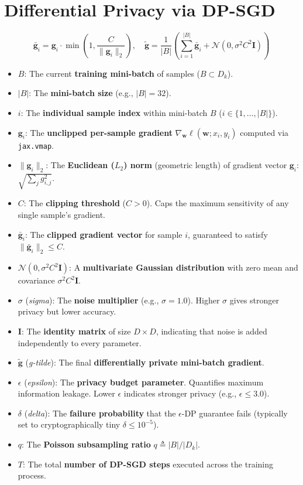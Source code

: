 \documentclass[11pt,a4paper,titlepage]{report}
\begin{document}
\section{Differential Privacy via DP-SGD}
\begin{equation}
    \bar{\mathbf{g}}_i = \mathbf{g}_i \cdot \min\left(1, \frac{C}{\|\mathbf{g}_i\|_2}\right), \quad \tilde{\mathbf{g}} = \frac{1}{|B|} \left( \sum_{i=1}^{|B|} \bar{\mathbf{g}}_i + \mathcal{N}(0, \sigma^2 C^2 \mathbf{I}) \right)
\end{equation}
\begin{itemize}[leftmargin=*]
    \item $B$: The current \textbf{training mini-batch} of samples ($B \subset D_k$).
    \item $|B|$: The \textbf{mini-batch size} (e.g., $|B| = 32$).
    \item $i$: The \textbf{individual sample index} within mini-batch $B$ ($i \in \{1, \dots, |B|\}$).
    \item $\mathbf{g}_i$: The \textbf{unclipped per-sample gradient} $\nabla_{\mathbf{w}} \ell(\mathbf{w}; x_i, y_i)$ computed via \texttt{jax.vmap}.
    \item $\|\mathbf{g}_i\|_2$: The \textbf{Euclidean ($L_2$) norm} (geometric length) of gradient vector $\mathbf{g}_i$: $\sqrt{\sum_j g_{i, j}^2}$.
    \item $C$: The \textbf{clipping threshold} ($C > 0$). Caps the maximum sensitivity of any single sample's gradient.
    \item $\bar{\mathbf{g}}_i$: The \textbf{clipped gradient vector} for sample $i$, guaranteed to satisfy $\|\bar{\mathbf{g}}_i\|_2 \le C$.
    \item $\mathcal{N}(0, \sigma^2 C^2 \mathbf{I})$: A \textbf{multivariate Gaussian distribution} with zero mean and covariance $\sigma^2 C^2 \mathbf{I}$.
    \item $\sigma$ (\textit{sigma}): The \textbf{noise multiplier} (e.g., $\sigma = 1.0$). Higher $\sigma$ gives stronger privacy but lower accuracy.
    \item $\mathbf{I}$: The \textbf{identity matrix} of size $D \times D$, indicating that noise is added independently to every parameter.
    \item $\tilde{\mathbf{g}}$ (\textit{g-tilde}): The final \textbf{differentially private mini-batch gradient}.
    \item $\epsilon$ (\textit{epsilon}): The \textbf{privacy budget parameter}. Quantifies maximum information leakage. Lower $\epsilon$ indicates stronger privacy (e.g., $\epsilon \le 3.0$).
    \item $\delta$ (\textit{delta}): The \textbf{failure probability} that the $\epsilon$-DP guarantee fails (typically set to cryptographically tiny $\delta \le 10^{-5}$).
    \item $q$: The \textbf{Poisson subsampling ratio} $q \triangleq |B| / |D_k|$.
    \item $T$: The total \textbf{number of DP-SGD steps} executed across the training process.
\end{itemize}
\end{document}
